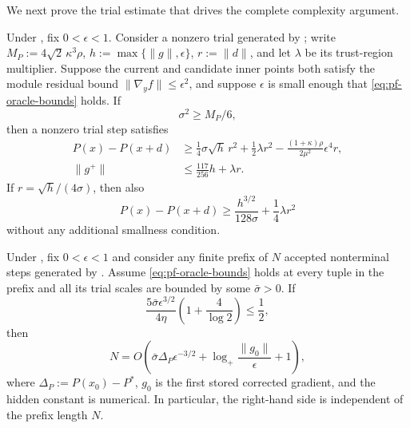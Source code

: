 \documentclass{article}
\begin{document}
We next prove the trial estimate that drives the complete complexity
argument.

\begin{lemma}
\label{lem:pf-safe-trial}
Under , fix $0<\epsilon<1$.  Consider a nonzero trial
generated by ; write
$M_P:=4\sqrt2\,\kappa^3\rho$,
$h:=\max\{\|g\|,\epsilon\}$, $r:=\|d\|$, and let $\lambda$ be its
trust-region multiplier.  Suppose the current and candidate inner
points both satisfy the module
residual bound $\|\nabla_yf\|\le\epsilon^2$, and suppose $\epsilon$ is
small enough that \eqref{eq:pf-oracle-bounds} holds.  If
\begin{equation}\label{eq:pf-safe-scale}
 \sigma^2\ge M_P/6,
\end{equation}
then a nonzero trial step satisfies
\begin{subequations}\label{eq:pf-safe-trial-bounds}
\begin{align}
 P(x)-P(x+d)
 &\ge\frac14\sigma\sqrt h\,r^2
 +\frac12\lambda r^2
 -\frac{(1+\kappa)\rho}{2\mu^2}\epsilon^4r,
       \label{eq:pf-safe-decrease}\\
 \|g^+\|
 &\le\frac{117}{256}h+\lambda r.
       \label{eq:pf-safe-gradient}
\end{align}
\end{subequations}
If $r=\sqrt h/(4\sigma)$, then also
\begin{equation}\label{eq:pf-safe-boundary-decrease}
 P(x)-P(x+d)
 \ge\frac{h^{3/2}}{128\sigma}
 +\frac14\lambda r^2
\end{equation}
without any additional smallness condition.
\end{lemma}




\begin{lemma}
\label{lem:pf-accepted-accounting}
Under , fix $0<\epsilon<1$ and consider any finite
prefix of $N$ accepted nonterminal steps generated by
.  Assume \eqref{eq:pf-oracle-bounds} holds
at every tuple in the prefix and all its trial scales are bounded by
some $\bar\sigma>0$.  If
\begin{equation}\label{eq:pf-absorption-condition}
 \frac{5\bar\sigma\epsilon^{3/2}}{4\eta}
 \left(1+\frac4{\log2}\right)\le\frac12,
\end{equation}
then
\begin{equation}\label{eq:pf-accepted-bound}
 N=O\!\left(
 \bar\sigma\Delta_P\epsilon^{-3/2}
  +\log_+\frac{\|g_0\|}{\epsilon}+1
 \right),
\end{equation}
where $\Delta_P:=P(x_0)-P^*$, $g_0$ is the first stored corrected
gradient, and the hidden constant is numerical.  In particular, the
right-hand side is independent of the prefix length $N$.
\end{lemma}
\end{document}
